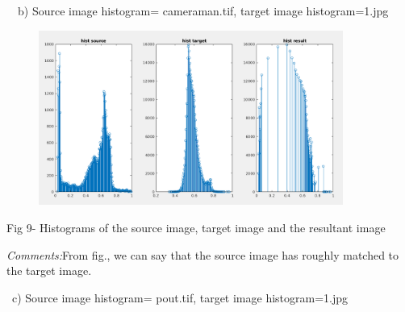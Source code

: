 \documentclass[12pt]{article}
\begin{document}
\begin{justify}
\ \  b) Source image histogram= cameraman.tif, target image histogram=1.jpg
\end{justify}\par

\tab \tab 
\vspace{\baselineskip}


\begin{figure}[H]
	\begin{Center}
		\includegraphics[width=3.93in,height=2.26in]{./media/image18.png}
	\end{Center}
\end{figure}



\par

\begin{Center}
Fig 9- Histograms of the source image, target image and the resultant image
\end{Center}\par


\vspace{\baselineskip}
\begin{adjustwidth}{1.0in}{0.0in}
\begin{justify}
\textit{Comments:}From fig., we can say that the source image has roughly matched to the target image.
\end{justify}\par

\end{adjustwidth}


\vspace{\baselineskip}
\begin{justify}
\  c) Source image histogram= pout.tif, target image histogram=1.jpg
\end{justify}\par
\end{document}

